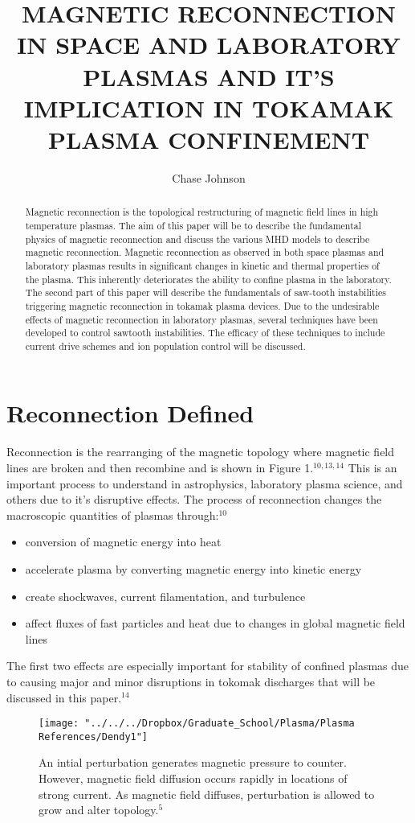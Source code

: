 \documentclass{article}
\begin{document}
\title{MAGNETIC RECONNECTION IN SPACE AND LABORATORY PLASMAS AND IT’S IMPLICATION IN TOKAMAK PLASMA CONFINEMENT}
\author{Chase Johnson}

\maketitle

\begin{abstract}
Magnetic reconnection is the topological restructuring of magnetic field lines in high temperature plasmas.    The aim of this paper will be to describe the fundamental physics of magnetic reconnection and discuss the various MHD models to describe magnetic reconnection.  Magnetic reconnection as observed in both space plasmas and laboratory plasmas results in significant changes in kinetic and thermal properties of the plasma.  This inherently deteriorates the ability to confine plasma in the laboratory.  The second part of this paper will describe the fundamentals of saw-tooth instabilities triggering magnetic reconnection in tokamak plasma devices.  Due to the undesirable effects of magnetic reconnection in laboratory plasmas, several techniques have been developed to control sawtooth instabilities.  The efficacy of these techniques to include current drive schemes and ion population control will be discussed.
\end{abstract}
\section{Reconnection Defined}
Reconnection is the rearranging of the magnetic topology where magnetic field lines are broken and then recombine and is shown in Figure 1.$^{10,13,14}$  This is an important process to understand in astrophysics, laboratory plasma science, and others due to it's disruptive effects.  The process of reconnection changes the macroscopic quantities of plasmas through:$^{10}$
\begin{itemize}
\item conversion of magnetic energy into heat
\item accelerate plasma by converting magnetic energy into kinetic energy
\item create shockwaves, current filamentation, and turbulence
\item affect fluxes of fast particles and heat due to changes in global magnetic field lines
\end{itemize}
The first two effects are especially important for stability of confined plasmas due to causing major and minor disruptions in tokomak discharges that will be discussed in this paper.$^{14}$
\begin{figure}[h]
\centering
\texttt{[image: "../../../Dropbox/Graduate\_School/Plasma/Plasma References/Dendy1"]}
\caption{An intial perturbation generates magnetic pressure to counter. However, magnetic field diffusion occurs rapidly in locations of strong current. As magnetic field diffuses, perturbation is allowed to grow and alter topology.$^{5}$}
\label{fig:Dendy1}
\end{figure}
\end{document}
